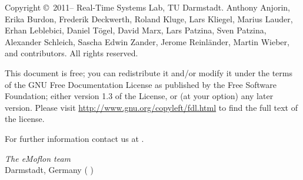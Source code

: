 \begin{small} 
Copyright \copyright~2011--\the\year{} Real-Time Systems Lab, TU Darmstadt.
Anthony Anjorin, Erika Burdon, Frederik Deckwerth, Roland Kluge, Lars Kliegel, Marius Lauder,
Erhan Leblebici, Daniel T\"ogel, David Marx, Lars Patzina, Sven Patzina, Alexander Schleich, Sascha Edwin Zander, Jerome Reinl\"ander, Martin Wieber, and contributors.
All rights reserved.

This document is free; you can redistribute it and/or modify it under the terms of the GNU Free Documentation License as published by the Free Software Foundation; either version 1.3 of the License, or (at your option) any later version.
Please visit \href{http://www.gnu.org/copyleft/fdl.html}{http://www.gnu.org/copyleft/fdl.html} to find the full text of the license.
 
  
For further information contact us at \eMoflonContact.
  
\vskip3cm
\textit{The eMoflon team}\\
Darmstadt, Germany (\monthword{\month} \the\year)
\end{small}